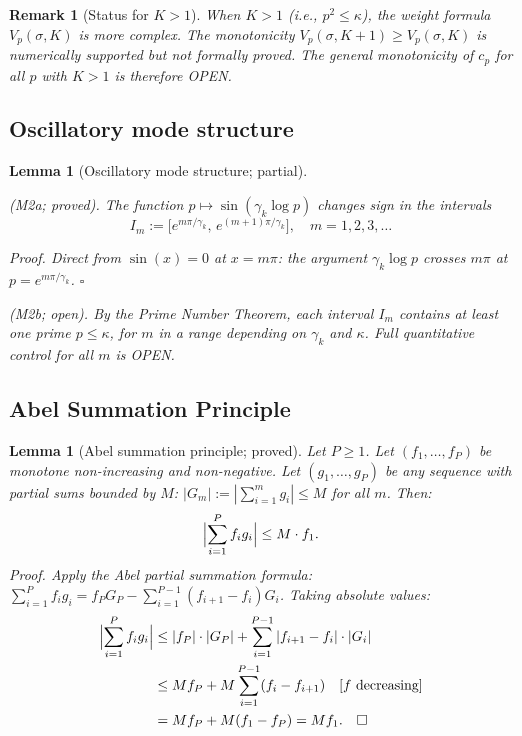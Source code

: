 \documentclass[11pt]{article}
\newtheorem{lemma}[theorem]{Lemma}
\newtheorem*{remark}{Remark}
\begin{document}
\begin{remark}[Status for $K>1$]
When $K>1$ (i.e., $p^2\leq\kappa$), the weight formula $V_p(\sigma,K)$
is more complex.
The monotonicity $V_p(\sigma,K+1)\geq V_p(\sigma,K)$ is numerically
supported but not formally proved.
The general monotonicity of $c_p$ for all $p$ with $K>1$ is therefore
OPEN.
\end{remark}

\subsection{Oscillatory mode structure}

\begin{lemma}[Oscillatory mode structure; partial]\label{lem:M2}

\emph{(M2a; proved).}
The function $p\mapsto\sin(\gamma_k\log p)$ changes sign in the
intervals
\[
I_m := \bigl[e^{m\pi/\gamma_k},\, e^{(m+1)\pi/\gamma_k}\bigr],
\quad m = 1,2,3,\ldots
\]

\emph{Proof.}
Direct from $\sin(x)=0$ at $x=m\pi$: the argument
$\gamma_k\log p$ crosses $m\pi$ at $p = e^{m\pi/\gamma_k}$. $\square$

\emph{(M2b; open).}
By the Prime Number Theorem, each interval $I_m$ contains at least
one prime $p\leq\kappa$, for $m$ in a range depending on $\gamma_k$
and $\kappa$.
Full quantitative control for all $m$ is OPEN.
\end{lemma}

\subsection{Abel Summation Principle}

\begin{lemma}[Abel summation principle; proved]\label{lem:M3}
Let $P\geq 1$.
Let $(f_1,\ldots,f_P)$ be monotone non-increasing and non-negative.
Let $(g_1,\ldots,g_P)$ be any sequence with partial sums bounded by $M$:
$|G_m| := |\sum_{i=1}^m g_i|\leq M$ for all $m$.
Then:
\[
\Bigl|\sum_{i=1}^P f_i g_i\Bigr| \leq M\cdot f_1.
\]
\emph{Proof.}
Apply the Abel partial summation formula:
$\sum_{i=1}^P f_i g_i = f_P G_P - \sum_{i=1}^{P-1}(f_{i+1}-f_i)G_i$.
Taking absolute values:
\begin{align*}
\Bigl|\sum_{i=1}^P f_i g_i\Bigr|
&\leq |f_P|\cdot|G_P| + \sum_{i=1}^{P-1}|f_{i+1}-f_i|\cdot|G_i| \\
&\leq Mf_P + M\sum_{i=1}^{P-1}(f_i-f_{i+1})
 \quad\text{[$f$ decreasing]} \\
&= Mf_P + M(f_1-f_P) = Mf_1. \quad\square
\end{align*}
\end{lemma}
\end{document}
